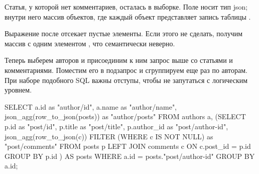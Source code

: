 

Статья, у которой нет комментариев, осталась в выборке. Поле  носит тип json; внутри него массив объектов, где каждый объект представляет запись таблицы .

Выражение  после  отсекает пустые элементы. Если этого не сделать, получим массив с одним элементом , что семантически неверно.

Теперь выберем авторов и присоединим к ним запрос выше со статьями и комментариями. Поместим его в подзапрос и сгруппируем еще раз по авторам. При наборе подобного SQL важны отступы, чтобы не запутаться с логическим уровнем.

\begin{english}
  \begin{sql}
SELECT
  a.id                         as "author/id",
  a.name                       as "author/name",
  json_agg(row_to_json(posts)) as "author/posts"
FROM
  authors a,
  (SELECT
    p.id        as "post/id",
    p.title     as "post/title",
    p.author_id as "post/author-id",
    json_agg(row_to_json(c)) FILTER
            (WHERE c IS NOT NULL) as "post/comments"
  FROM posts p
  LEFT JOIN comments c ON c.post_id = p.id
  GROUP BY p.id
) AS posts
WHERE a.id = posts."post/author-id"
GROUP BY a.id;
  \end{sql}
\end{english}

